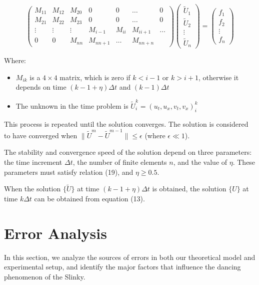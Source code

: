 \documentclass{mcmthesis}  %
\begin{document}
\begin{equation}
\begin{pmatrix}
M_{11} & M_{12} & M_{20} & 0 & 0 & \ldots & 0 \\
M_{21} & M_{22} & M_{23} & 0 & 0 & \ldots & 0 \\
\vdots & \vdots & \vdots & M_{i-1} & M_{ii} & M_{ii+1} & \ldots \\
0 & 0 & M_{nn} & M_{nn+1} & \ldots & M_{nn+n}
\end{pmatrix}
\begin{pmatrix}
\tilde{U}_1 \\
\tilde{U}_2 \\
\vdots \\
\tilde{U}_n
\end{pmatrix} =
\begin{pmatrix}
f_1 \\
f_2 \\
\vdots \\
f_n
\end{pmatrix}
\end{equation}

Where:

\begin{itemize}
    \item $M_{ik}$ is a $4 \times 4$ matrix, which is zero if $k < i - 1$ or $k > i + 1$, otherwise it depends on time $(k - 1 + \eta)\Delta t$ and $(k - 1)\Delta t$
    \item The unknown in the time problem is $\tilde{U}_i^k = (u_t, u_x, v_t, v_x)_i^k$
\end{itemize}

This process is repeated until the solution converges. The solution is considered to have converged when $\|\tilde{U}^m - \tilde{U}^{m-1}\| \leq \epsilon$ (where $\epsilon \ll 1$).

The stability and convergence speed of the solution depend on three parameters: the time increment $\Delta t$, the number of finite elements $n$, and the value of $\eta$. These parameters must satisfy relation (19), and $\eta \geq 0.5$.

When the solution $\{\tilde{U}\}$ at time $(k - 1 + \eta)\Delta t$ is obtained, the solution $\{U\}$ at time $k\Delta t$ can be obtained from equation (13).

\section{Error Analysis}
In this section, we analyze the sources of errors in both our theoretical model and experimental setup, and identify the major factors that influence the dancing phenomenon of the Slinky.
\end{document}
